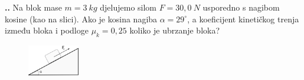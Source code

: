

\noindent 
\textbf{
\thecjelina.\thezadatak.}
Na blok mase $m = 3\ kg$ djelujemo silom $F = 30,0\ N$
usporedno s nagibom kosine (kao na slici). Ako je kosina
nagiba $\alpha = 29^\circ$, a koeficijent kineti\v{c}kog trenja između
bloka i podloge $\mu_k = 0,25$ koliko je ubrzanje bloka?


\begin{figure}[ht]%
  \begin{center}
    \includegraphics[width=0.20\textwidth]{../03_Dinamika_materijalne_tocke/Zadatak_D605.png}
  \end{center}
\end{figure}

